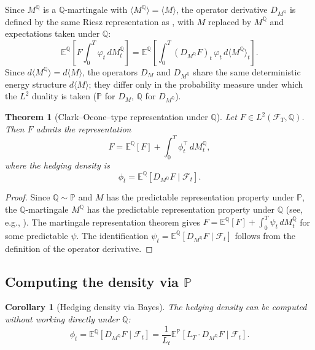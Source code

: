\documentclass[11pt]{article}
\theoremstyle{plain}
\newtheorem{theorem}{Theorem}[section]
\newtheorem{corollary}{Corollary}[section]
\theoremstyle{definition}
\theoremstyle{remark}
\newcommand{\E}{\mathbb{E}}
\newcommand{\F}{\mathcal{F}}
\newcommand{\PP}{\mathbb{P}}
\newcommand{\QQ}{\mathbb{Q}}
\newcommand{\bracket}[1]{\langle #1 \rangle}
\begin{document}
Since $M^{\QQ}$ is a $\QQ$-martingale with $\bracket{M^{\QQ}} = \bracket{M}$,
the operator derivative $D_{M^{\QQ}}$ is defined by the same Riesz
representation as , with $M$ replaced by $M^{\QQ}$ and
expectations taken under $\QQ$:
\[
\E^{\QQ}\!\left[F \int_0^T \varphi_t\,dM_t^{\QQ}\right]
= \E^{\QQ}\!\left[\int_0^T (D_{M^{\QQ}} F)_t\,\varphi_t\,d\bracket{M^{\QQ}}_t\right].
\]
Since $d\bracket{M^{\QQ}} = d\bracket{M}$, the operators $D_M$ and
$D_{M^{\QQ}}$ share the same deterministic energy structure $d\bracket{M}$;
they differ only in the probability measure under which the $L^2$ duality
is taken ($\PP$ for $D_M$, $\QQ$ for $D_{M^{\QQ}}$).

\begin{theorem}[Clark--Ocone--type representation under $\QQ$]\label{thm:clark-ocone-Q}
Let $F \in L^2(\F_T, \QQ)$. Then $F$ admits the representation
\begin{equation}\label{eq:CO-Q}
F = \E^{\QQ}[F] + \int_0^T \phi_t^\top\,dM_t^{\QQ},
\end{equation}
where the hedging density is
\begin{equation}\label{eq:phi-Q}
\phi_t = \E^{\QQ}[D_{M^{\QQ}} F \mid \F_t].
\end{equation}
\end{theorem}

\begin{proof}
Since $\QQ \sim \PP$ and $M$ has the predictable representation property
under $\PP$, the $\QQ$-martingale $M^{\QQ}$ has the predictable representation
property under $\QQ$ (see, e.g., \cite[Thm.~3.4.34]{KaratzasShreve1991}).
The martingale representation theorem gives
$F = \E^{\QQ}[F] + \int_0^T \psi_t\,dM_t^{\QQ}$ for some
predictable $\psi$. The identification $\psi_t = \E^{\QQ}[D_{M^{\QQ}} F \mid \F_t]$
follows from the definition of the operator derivative.
\end{proof}

\subsection{Computing the density via $\PP$}

\begin{corollary}[Hedging density via Bayes]\label{cor:phi-bayes}
The hedging density can be computed without working directly under $\QQ$:
\begin{equation}\label{eq:phi-bayes}
\phi_t = \E^{\QQ}[D_{M^{\QQ}} F \mid \F_t] = \frac{1}{L_t}\E^{\PP}[L_T \cdot D_{M^{\QQ}} F \mid \F_t].
\end{equation}
\end{corollary}
\end{document}
